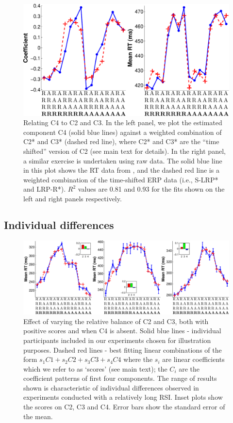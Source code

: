 \documentclass{apa}[12pt]
\begin{document}
\begin{figure}[t]
\centering
\includegraphics[width=.7\textwidth]{fits_4back.pdf}
\caption[C4 as the consequence of delayed activation of C2 and C3]{Relating C4 to C2 and C3. In the left panel, we plot the estimated component C4 (solid blue lines) against a weighted combination of C2* and C3* (dashed red line), where C2* and C3* are the ``time shifted'' version of C2 (see main text for details). In the right panel, a similar exercise is undertaken using raw data. The solid blue line in this plot shows the RT data from \protect{}, and the dashed red line is a weighted combination of the time-shifted ERP data (i.e., S-LRP* and LRP-R*). $R^2$ values are 0.81 and 0.93 for the fits shown on the left and right panels respectively.}\label{fits_4back}
\end{figure}

\subsection{Individual differences}

\begin{figure}[t]
\centering
\includegraphics[width=1\textwidth]{typical.pdf}
\caption[Effect of varying the balance of C2 and C3]{Effect of varying the relative balance of C2 and C3, both with positive scores and when C4 is absent. Solid blue lines - individual participants included in our experiments chosen for illustration purposes. Dashed red lines - best fitting linear combinations of the form $s_1C1 + s_2C2 + s_3C3 + s_4C4$ where the $s_i$ are linear coefficients which we refer to as `scores' (see main text); the $C_i$ are the coefficient patterns of first four components. The range of results shown is characteristic of individual differences observed in experiments conducted with a relatively long RSI. Inset plots show the scores on C2, C3 and C4. Error bars show the standard error of the mean.\label{typical_subjects}}
\end{figure}
\end{document}
